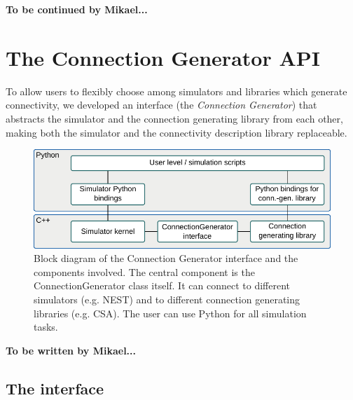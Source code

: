 \documentclass{frontiersSCNS} %
\newcommand{\tbw}[1]{{\bf\parindent0pt\color{red}#1}}
\begin{document}
\tbw{To be continued by Mikael...}


\section{The Connection Generator API}

To allow users to flexibly choose among simulators and libraries
which generate connectivity, we developed an interface (the
\emph{Connection Generator}) that abstracts the simulator and the
connection generating library from each other, making both the
simulator and the connectivity description library replaceable.

\begin{figure}[ht]
\centering
\includegraphics[scale=.8]{figures/block_diagram_conngen.pdf}
\caption{Block diagram of the Connection Generator interface and the
  components involved. The central component is the
  ConnectionGenerator class itself. It can connect to different simulators
  (e.g. NEST) and to different connection generating libraries
  (e.g. CSA). The user can use Python for all simulation
  tasks.}\label{fig:block_diagram_conngen}
\end{figure}

\tbw{To be written by Mikael...}

\subsection{The interface}\label{sec:cgint}
\end{document}
